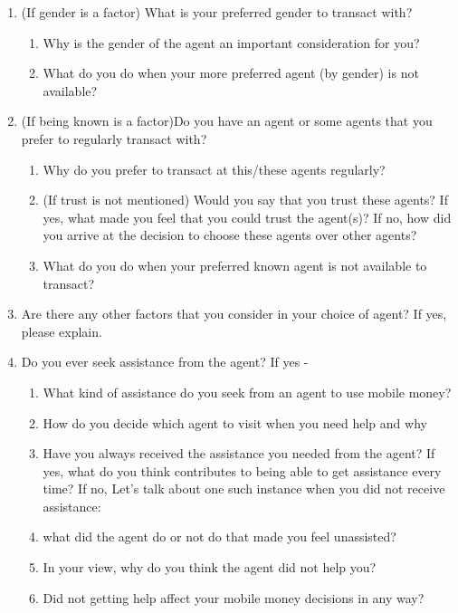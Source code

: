 \begin{appendices}
\begin{enumerate}
    \item (If gender is a factor) What is your preferred gender to transact with?
    \begin{enumerate}
        \item Why is the gender of the agent an important consideration for you? 
        \item What do you do when your more preferred agent (by gender) is not available? 
    \end{enumerate}

    \item (If being known is a factor)Do you have an agent or some agents that you prefer to regularly transact with?
    \begin{enumerate}
        \item Why do you prefer to transact at this/these agents regularly?
        \item (If trust is not mentioned) Would you say that you trust these agents? If yes, what made you feel that you could trust the agent(s)? If no, how did you arrive at the decision to choose these agents over other agents?
        \item What do you do when your preferred known agent is not available to transact?
    \end{enumerate}

    \item Are there any other factors that you consider in your choice of agent? If yes, please explain.
    
    \item Do you ever seek assistance from the agent? If yes - 
    \begin{enumerate}
        \item What kind of assistance do you seek from an agent to use mobile money?
        \item How do you decide which agent to visit when you need help and why
        \item Have you always received the assistance you needed from the agent? If yes, what do you think contributes to being able to get assistance every time? If no, Let's talk about one such instance when you did not receive assistance:
        \item what did the agent do or not do that made you feel unassisted?
        \item In your view, why do you think the agent did not help you?
        \item Did not getting help affect your mobile money decisions in any way?
    \end{enumerate}


\end{enumerate}
\end{appendices}
